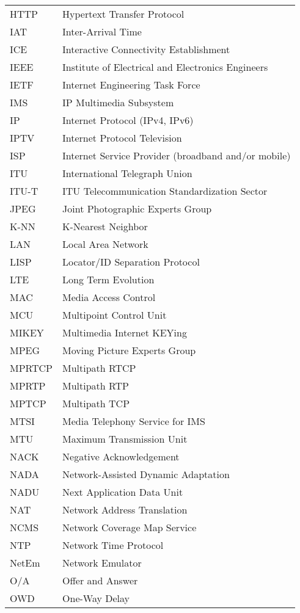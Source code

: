 \begin{longtable}{ll}
HTTP 	& Hypertext Transfer Protocol \\
IAT  	& Inter-Arrival Time \\
ICE  	& Interactive Connectivity Establishment \\
IEEE 	& Institute of Electrical and Electronics Engineers \\
IETF	& Internet Engineering Task Force \\
IMS 	& IP Multimedia Subsystem \\
IP  	& Internet Protocol (IPv4, IPv6)\\
IPTV 	& Internet Protocol Television \\
ISP 	& Internet Service Provider (broadband and/or mobile) \\
ITU 	& International Telegraph Union \\
ITU-T 	& ITU Telecommunication Standardization Sector \\
JPEG 	& Joint Photographic Experts Group \\
K-NN 	& K-Nearest Neighbor \\
LAN 	& Local Area Network \\
LISP 	& Locator/ID Separation Protocol\\
LTE 	& Long Term Evolution \\
MAC 	& Media Access Control \\
MCU 	& Multipoint Control Unit \\
MIKEY	& Multimedia Internet KEYing \\
MPEG 	& Moving Picture Experts Group \\
MPRTCP	& Multipath RTCP \\
MPRTP 	& Multipath RTP \\
MPTCP 	& Multipath TCP \\
MTSI 	& Media Telephony Service for IMS\\
MTU  	& Maximum Transmission Unit \\
NACK 	& Negative Acknowledgement \\
NADA 	& Network-Assisted Dynamic Adaptation \\
NADU 	& Next Application Data Unit \\
NAT 	& Network Address Translation \\
NCMS 	& Network Coverage Map Service\\
NTP  	& Network Time Protocol \\
NetEm 	& Network Emulator \\
O/A  	& Offer and Answer \\
OWD 	& One-Way Delay \\

\end{longtable}
